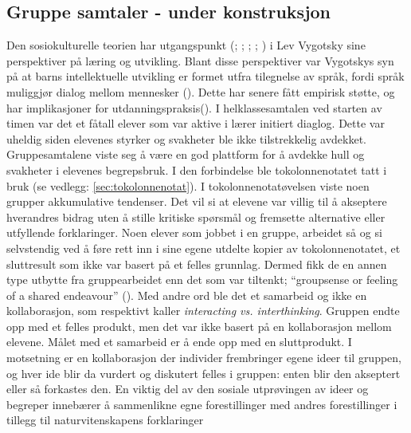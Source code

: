\documentclass[main.tex]{subfiles}
\begin{document}
\subsection*{Gruppe samtaler - under konstruksjon}
Den sosiokulturelle teorien har utgangspunkt (; ; 
; ; ) i Lev Vygotsky sine 
perspektiver på læring og utvikling. Blant disse perspektiver var Vygotskys syn på at barns 
intellektuelle utvikling er formet utfra tilegnelse av språk, fordi språk muliggjør dialog 
mellom mennesker (). Dette har senere fått empirisk støtte, og har 
implikasjoner for utdanningspraksis().
\newline
\newline
I helklassesamtalen ved starten av timen var det et fåtall elever som var aktive i lærer initiert 
diaglog. Dette var uheldig siden elevenes styrker og svakheter ble ikke tilstrekkelig avdekket. 
Gruppesamtalene viste seg å være en god plattform for å avdekke hull og svakheter i elevenes 
begrepsbruk. I den forbindelse ble tokolonnenotatet tatt i bruk (se vedlegg: 
\ref{sec:tokolonnenotat}).
\newline
\newline
I tokolonnenotatøvelsen viste noen grupper akkumulative tendenser. Det vil si at elevene 
var villig til å akseptere hverandres bidrag uten å stille kritiske spørsmål og fremsette
alternative eller utfyllende forklaringer. Noen elever som jobbet i en gruppe, arbeidet så og si
selvstendig ved å føre rett inn i sine egene utdelte kopier av tokolonnenotatet, et sluttresult som 
ikke var basert på et felles grunnlag. Dermed fikk de en annen type utbytte fra gruppearbeidet
enn det som var tiltenkt; ``groupsense or feeling of a shared endeavour'' (). 
Med andre ord ble det et samarbeid og ikke en kollaborasjon, som  respektivt kaller 
\emph{interacting vs. interthinking}. Gruppen endte opp med et felles produkt, men det var ikke 
basert på en kollaborasjon mellom elevene. Målet med et samarbeid er å ende opp med en sluttprodukt. 
I motsetning er en kollaborasjon der individer frembringer egene ideer til gruppen, og hver ide
blir da vurdert og diskutert felles i gruppen: enten blir den akseptert eller så forkastes den.
\newline
\newline
En viktig del av den sosiale utprøvingen av ideer og begreper innebærer å sammenlikne egne 
forestillinger med andres forestillinger i tillegg til naturvitenskapens forklaringer 
\end{document}
